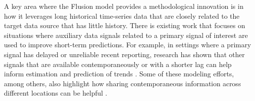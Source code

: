 \documentclass{article}\usepackage[]{graphicx}\usepackage[]{xcolor}
\begin{document}
A key area where the Flusion model provides a methodological innovation is in how it leverages long historical time-series data that are closely related to the target data source that has little history.
There is existing work that focuses on situations where auxiliary data signals related to a primary signal of interest are used to improve short-term predictions.
For example, in settings where a primary signal has delayed or unreliable recent reporting, research has shown that other signals that are available contemporaneously or with a shorter lag can help inform estimation and prediction of trends \cite{yang_accurate_2015,farrow_modeling_2016,osthus_even_2019,leuba_tracking_2020,mcdonald_can_2021,jahja_real-time_2022}.
Some of these modeling efforts, among others, also highlight how sharing contemporaneous information across different locations can be helpful \cite{farrow_modeling_2016,mcdonald_can_2021,osthus_multiscale_2021}.
\end{document}
